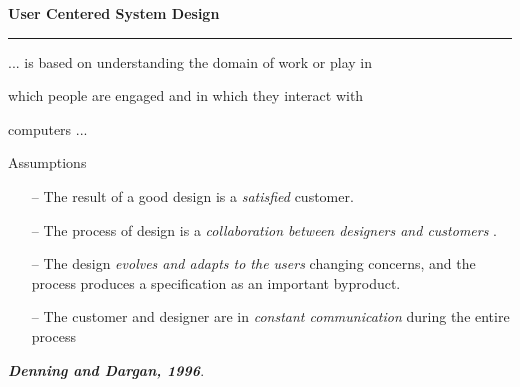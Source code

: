 \documentclass[pdf]{beamer}
\begin{document}
\begin{frame}
\vspace{8mm}
\textcolor{myBlue}{\textbf{\Large{User Centered System Design}}}

\textcolor{red}{\rule{10cm}{1mm}}

... is based on understanding the domain of work or play in \par which people are engaged and in which they interact with \par computers ...

\bigskip

Assumptions

\begin{itemize}
    \item[\textcolor{black}{--}] The result of a good design is a \textit{satisfied} customer.
    
    \item[\textcolor{black}{--}] The process of design is a \textit{collaboration between designers and  customers }. 

    \item[\textcolor{black}{--}] The design \textit{evolves and adapts to the users} changing concerns, and the process produces a specification as an important byproduct.

    \item[\textcolor{black}{--}] The customer and designer are in \textit{ constant communication } during  the entire process

    \end{itemize}

\begin{flushright}
\textbf{\textit{Denning and Dargan, 1996}}.
\end{flushright}
\end{frame}
\end{document}

